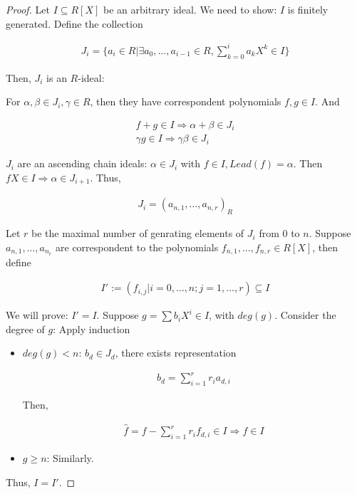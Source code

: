 \documentclass[Total.tex]{subfiles}
\begin{document}
		\begin{proof}
			Let $I\subseteq R[X]$ be an arbitrary ideal. We need to show: $I$ is finitely generated. Define the collection
			
			\begin{gather*}
				J_i=\{a_i\in R|\exists a_0,\dots,a_{i-1}\in R,\sum_{k=0}^i a_k X^k\in I\}
			\end{gather*}
			
			Then, $J_i$ is an $R$-ideal:
			
			For $\alpha,\beta\in J_i,\gamma\in R$, then they have correspondent polynomials $f,g\in I$. And
			
			\begin{gather*}
				f+g\in I\Rightarrow \alpha+\beta\in J_i\\
				\gamma g\in I\Rightarrow \gamma\beta\in J_i
			\end{gather*}
			
			$J_i$ are an ascending chain ideals: $\alpha\in J_i$ with $f\in I,Lead(f)=\alpha$. Then $fX\in I\Rightarrow \alpha\in J_{i+1}$. Thus, 
			
			\begin{gather*}
				J_i=(a_{n,1},\dots,a_{n,r})_{R}
			\end{gather*}
			
			Let $r$ be the maximal number of genrating elements of $J_i$ from $0$ to $n$. Suppose $a_{n,1},\dots,a_{n_r}$ are correspondent to the polynomials $f_{n,1},\dots,f_{n,r}\in R[X]$, then define
			
			\begin{gather*}
				I':=(f_{i,j}|i=0,\dots,n;j=1,\dots,r)\subseteq I
			\end{gather*}
			
			We will prove: $I'=I$. Suppose $g=\sum b_i X^i\in I$, with $deg(g)$. Consider the degree of $g$: Apply induction
			
			\begin{itemize}
				\item $deg(g)<n$: $b_d\in J_d$, there exists representation
				
				\begin{gather*}
					b_d=\sum_{i=1}^r r_i a_{d,i} 
				\end{gather*}
				
				Then,
				
				\begin{gather*}
					\hat{f}=f-\sum_{i=1}^r r_i f_{d,i}\in I\Rightarrow f\in I
				\end{gather*}
				
				\item $g\geq n$: Similarly.
			\end{itemize}
			
			Thus, $I=I'$. 
		\end{proof}
		
\end{document}
